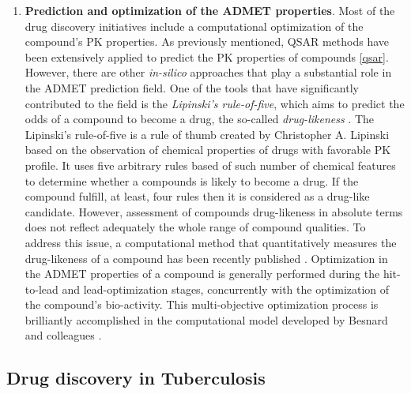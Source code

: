 \documentclass[12pt, b5paper,twoside]{tesi_upf}
\begin{document}
{\begin{enumerate}
\item \textbf{Prediction and optimization of the ADMET properties}. Most of the drug discovery initiatives include a computational optimization of the compound's PK properties. As previously mentioned, QSAR methods have been extensively applied to predict the PK properties of compounds \ref{qsar}. However, there are other \textit{in-silico} approaches that play a substantial role in the ADMET prediction field.   One of the tools that have significantly contributed to the field is the \textit{Lipinski's rule-of-five}, which aims to predict the odds of a compound to become a drug, the so-called \textit{drug-likeness} \cite{Lipinski2004}. The Lipinski's rule-of-five is a rule of thumb created by Christopher A. Lipinski based on the observation of chemical properties of drugs with favorable PK profile. It uses five arbitrary rules based of such number of chemical features to determine whether a compounds is likely to become a drug. If the compound fulfill, at least, four rules then it is considered as a drug-like candidate. However, assessment of compounds drug-likeness in absolute terms does not reflect adequately the whole range of compound qualities. To address this issue, a computational method that quantitatively measures the drug-likeness of a compound has been recently published \cite{Bickerton2012}. Optimization in the ADMET properties of a compound is generally performed during the hit-to-lead and lead-optimization stages, concurrently with the optimization of the compound's bio-activity. This multi-objective optimization process is brilliantly accomplished in the computational model developed by Besnard and colleagues \cite{Besnard2012b}.\end{enumerate}


\subsection{Drug discovery in Tuberculosis}}
\end{document}
